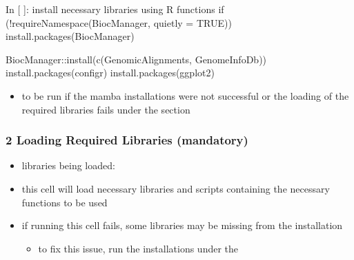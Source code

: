 \documentclass[letterpaper,10pt,english]{sphinxhowto}
\begin{document}
\begin{sphinxVerbatim}[commandchars=\\\{\}]
In [ ]: \PYGZsh{} install necessary libraries using R functions
        if (!requireNamespace(\PYGZdq{}BiocManager\PYGZdq{}, quietly = TRUE))
            install.packages(\PYGZdq{}BiocManager\PYGZdq{})

        BiocManager::install(c(\PYGZdq{}GenomicAlignments\PYGZdq{}, \PYGZdq{}GenomeInfoDb\PYGZdq{}))
        install.packages(\PYGZdq{}configr\PYGZdq{})
        install.packages(\PYGZdq{}ggplot2\PYGZdq{})
\end{sphinxVerbatim}
\begin{itemize}
\item {} 
\sphinxAtStartPar
to be run if the mamba installations were not successful or the loading of the required libraries fails under the  section

\end{itemize}


\subsubsection{2 \sphinxhyphen{} Loading Required Libraries (mandatory)}
\label{\detokenize{index:loading-required-libraries-mandatory}}\begin{itemize}
\item {} 
\sphinxAtStartPar
libraries being loaded:

\end{itemize}

\begin{sphinxVerbatim}[commandchars=\\\{\}]
 \PYG{p}{[} \PYG{p}{]} 

\end{sphinxVerbatim}
\begin{itemize}
\item {} 
\sphinxAtStartPar
this cell will load necessary libraries and scripts containing the necessary functions to be used

\item {} 
\sphinxAtStartPar
if running this cell fails, some libraries may be missing from the installation
\begin{itemize}
\item {} 
\sphinxAtStartPar
to fix this issue, run the installations under the 

\end{itemize}

\end{itemize}
\end{document}
